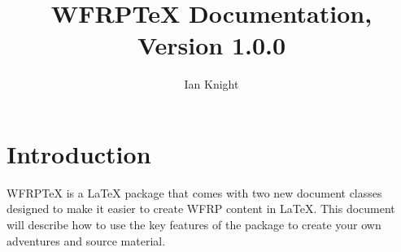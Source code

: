 \documentclass[10pt,a4paper]{article}
\title{WFRP\TeX{} Documentation, Version 1.0.0}
\author{Ian Knight}
\date{}
\begin{document}
\maketitle

\section{Introduction}
WFRP\TeX{} is a \LaTeX{} package that comes with two new document classes
designed to make it easier to create WFRP content in \LaTeX{}. This document
will describe how to use the key features of the package to create your
own adventures and source material.
\end{document}
